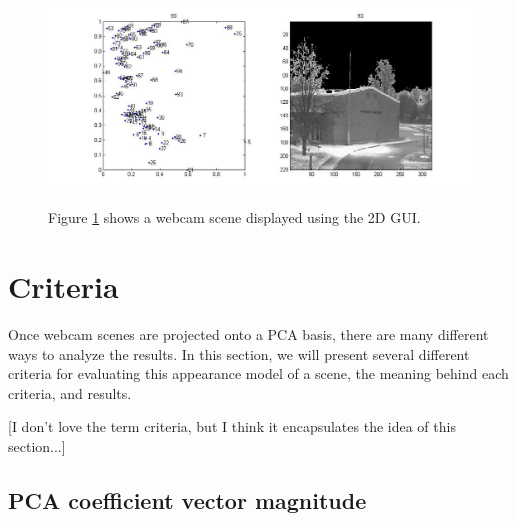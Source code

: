 \begin{figure}[ht]
	\centering
		\includegraphics[width=1\textwidth]{figures/2dGui.jpg}
	\label{fig:2dGui}
	
		\caption[Exploring 2D image space using a simple GUI.]{Figure \ref{fig:2dGui} shows a webcam scene displayed using the 2D GUI.}
\end{figure}


\section{Criteria}

Once webcam scenes are projected onto a PCA basis, there are many different ways to analyze the results.  In this section, we will present several different criteria for evaluating this appearance model of a scene, the meaning behind each criteria, and results.

[I don't love the term criteria, but I think it encapsulates the idea of this section...]

\subsection{PCA coefficient vector magnitude}

